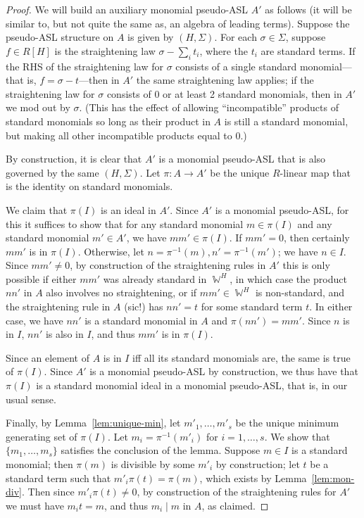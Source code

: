 \documentclass[11pt,reqno]{amsart}
\DeclareMathOperator{\W}{\mathbb{W}}
\newcommand{\divides}{\mid}
\theoremstyle{definition}
\numberwithin{equation}{section}
\begin{document}
\begin{proof}
We will build an auxiliary monomial pseudo-ASL $A'$ as follows (it will be similar to, but not quite the same as, an algebra of leading terms). Suppose the pseudo-ASL structure on $A$ is given by $(H, \Sigma)$. For each $\sigma \in \Sigma$, suppose $f \in R[H]$ is the straightening law $\sigma - \sum_i t_i$, where the $t_i$ are standard terms. If the RHS of the straightening law for $\sigma$ consists of a single standard monomial---that is, $f = \sigma - t$---then in $A'$ the same straightening law applies; if the straightening law for $\sigma$ consists of 0 or at least 2 standard monomials, then in $A'$ we mod out by $\sigma$. (This has the effect of allowing ``incompatible'' products of standard monomials so long as their product in $A$ is still a standard monomial, but making all other incompatible products equal to $0$.) 

By construction, it is clear that $A'$ is a monomial pseudo-ASL that is also governed by the same $(H, \Sigma)$. Let $\pi \colon A \to A'$ be the unique $R$-linear map that is the identity on standard monomials. 

We claim that $\pi(I)$ is an ideal in $A'$. Since $A'$ is a monomial pseudo-ASL, for this it suffices to show that for any standard monomial $m \in \pi(I)$ and any standard monomial $m' \in A'$, we have $mm' \in \pi(I)$. If $mm' = 0$, then certainly $mm'$ is in $\pi(I)$. Otherwise, let $n = \pi^{-1}(m), n' = \pi^{-1}(m')$; we have $n \in I$. Since $mm' \neq 0$, by construction of the straightening rules in $A'$ this is only possible if either $mm'$ was already standard in $\W^H$, in which case the product $nn'$ in $A$ also involves no straightening, or if $mm' \in \W^H$ is non-standard, and the straightening rule in $A$ (sic!) has $nn' = t$ for some standard term $t$. In either case, we have $nn'$ is a standard monomial in $A$ and $\pi(nn') = mm'$. Since $n$ is in $I$, $nn'$ is also in $I$, and thus $mm'$ is in $\pi(I)$.

Since an element of $A$ is in $I$ iff all its standard monomials are, the same is true of $\pi(I)$. Since $A'$ is a monomial pseudo-ASL by construction, we thus have that $\pi(I)$ is a standard monomial ideal in a monomial pseudo-ASL, that is, in our usual sense.

Finally, by Lemma~\ref{lem:unique-min}, let $m'_1, \dotsc, m'_s$ be the unique minimum generating set of $\pi(I)$. Let $m_i = \pi^{-1}(m'_i)$ for $i=1,\dotsc,s$. We show that $\{m_1,\dotsc,m_s\}$ satisfies the conclusion of the lemma. Suppose $m \in I$ is a standard monomial; then $\pi(m)$ is divisible by some $m'_i$ by construction; let $t$ be a standard term such that $m'_i \pi(t) = \pi(m)$, which exists by Lemma~\ref{lem:mon-div}. Then since $m'_i \pi(t) \neq 0$, by construction of the straightening rules for $A'$ we must have $m_i t = m$, and thus $m_i \divides m$ in $A$, as claimed.
\end{proof}
\end{document}
